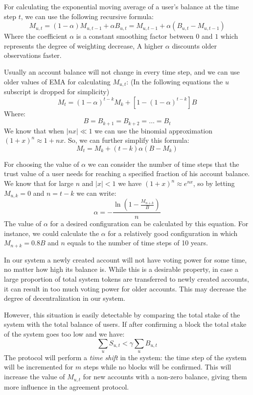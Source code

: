 \documentclass[11pt, A4]{report}
\begin{document}
    For calculating the exponential moving average of a user's balance at the time step \(t\), we can use the following
    recursive formula:
    \[
        M_{u,t} = (1 - \alpha) M_{u,t-1} + \alpha B_{u,t} = M_{u,t-1} + \alpha (B_{u,t} - M_{u,t-1})
    \]
    Where the coefficient \(\alpha\) is a constant smoothing factor between \(0\) and \(1\) which represents the
    degree of weighting decrease, A higher \(\alpha\) discounts older observations faster.

    Usually an account balance will not change in every time step, and we can use older values of EMA for calculating
    \(M_{u,t}\): (In the following equations the \(u\) subscript is dropped for simplicity)
    \[
        M_{t} = (1 - \alpha)^{t-k}M_{k} + [1 - (1 - \alpha)^{t - k}]B
    \]
    Where:
    \[
        B = B_{k+1} = B_{k+2} = \dots = B_{t}
    \]
    We know that when \(|nx| \ll 1\) we can use the binomial approximation \({(1 + x)^n \approx 1 + nx}\). So, we can
    further simplify this formula:
    \[
        M_{t} = M_{k} + (t - k) \alpha (B - M_{k})
    \]

    For choosing the value of \(\alpha\) we can consider the number of time steps that the trust value of a user needs
    for reaching a specified fraction of his account balance. We know that for large \(n\) and \(|x| < 1\) we have
    \((1 + x)^n \approx e^{nx}\), so by letting \(M_{u,k} = 0\) and \(n = t - k\) we can write:
    \[
        \alpha =- \frac{\ln\left(1 - \frac{M_{n+k}}{B}\right)}{n}
    \]
    The value of \(\alpha\) for a desired configuration can be calculated by this equation. For instance, we could
    calculate the \(\alpha\) for a relatively good configuration in which \(M_{n+k} = 0.8B\) and \(n\) equals to the
    number of time steps of 10 years.

    In our system a newly created account will not have voting power for some time, no matter how high its
    balance is. While this is a desirable property, in case a large proportion of total system tokens are
    transferred to newly created accounts, it can result in too much voting power for older accounts. This may decrease
    the degree of decentralization in our system.

    However, this situation is easily detectable by comparing the total stake of the system with the total balance of
    users. If after confirming a block the total stake of the system goes too low and we have:
    \[
        \sum_{u}S_{u,t} < \gamma \sum_{u}B_{u,t}
    \]
    The protocol will perform a \emph{time shift} in the system: the time step of the system
    will be incremented for \(m\) steps while no blocks will be confirmed. This will increase the value of \(M_{u,t}\)
    for new accounts with a non-zero balance, giving them more influence in the agreement protocol.
\end{document}
